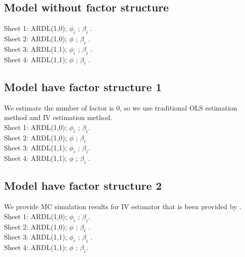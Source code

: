 \documentclass[12pt,a4paper,hyperref]{article}
\begin{document}
\subsection{Model  without factor structure }
Sheet 1: ARDL(1,0); $\phi_{i}$ ; $\beta_{i}$ .\\
Sheet 2: ARDL(1,0); $\phi$ ; $\beta_{i}$ .\\
Sheet 3: ARDL(1,1); $\phi_{i}$ ; $\beta_{i}$ .\\
Sheet 4: ARDL(1,1); $\phi$ ; $\beta_{i}$  . \\

\subsection{Model have factor structure 1}
We estimate the number of factor is $0$, so we use traditional OLS estimation method and IV estimation method.  \\
Sheet 1: ARDL(1,0); $\phi_{i}$ ; $\beta_{i}$. \\
Sheet 2: ARDL(1,0); $\phi$ ; $\beta_{i}$ \\
Sheet 3: ARDL(1,1); $\phi_{i}$ ; $\beta_{i}$. \\
Sheet 4: ARDL(1,1); $\phi$ ; $\beta_{i}$  . \\

\subsection{Model have factor structure 2}
 We provide MC simulation results for IV estimator that is been provided by \citet{Norkute:2019}. \\
 Sheet 1: ARDL(1,0); $\phi_{i}$ ; $\beta_{i}$. \\
Sheet 2: ARDL(1,0); $\phi$ ; $\beta_{i}$ .\\
Sheet 3: ARDL(1,1); $\phi_{i}$ ; $\beta_{i}$ .\\
Sheet 4: ARDL(1,1); $\phi$ ; $\beta_{i}$.   \\















\newpage

\renewcommand\refname{References}


\end{document}

